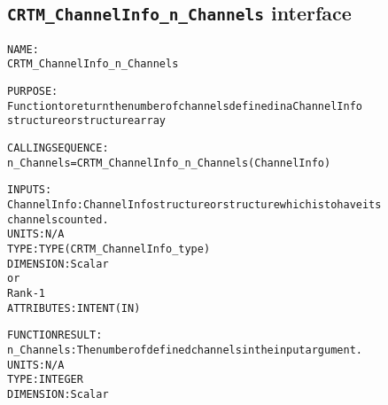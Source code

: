 \subsection{\texttt{CRTM\_ChannelInfo\_n\_Channels} interface}
  \label{sec:CRTM_ChannelInfo_n_Channels_interface}
  \begin{alltt}
 
  NAME:
        CRTM_ChannelInfo_n_Channels
 
  PURPOSE:
        Function to return the number of channels defined in a ChannelInfo
        structure or structure array
 
  CALLING SEQUENCE:
        n_Channels = CRTM_ChannelInfo_n_Channels( ChannelInfo )
 
  INPUTS:
        ChannelInfo: ChannelInfo structure or structure which is to have its
                     channels counted.
                     UNITS:      N/A
                     TYPE:       TYPE(CRTM_ChannelInfo_type)
                     DIMENSION:  Scalar
                                   or
                                 Rank-1
                     ATTRIBUTES: INTENT(IN)
 
  FUNCTION RESULT:
        n_Channels:   The number of defined channels in the input argument.
                     UNITS:      N/A
                     TYPE:       INTEGER
                     DIMENSION:  Scalar
 
  \end{alltt}
